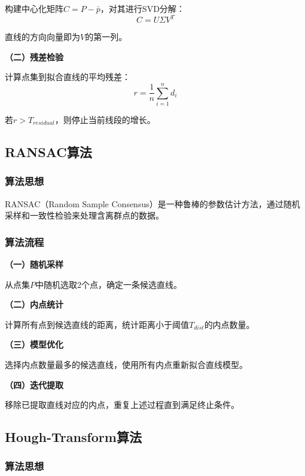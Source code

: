 \documentclass[12pt,a4paper]{article}
\begin{document}
构建中心化矩阵$C = P - \bar{p}$，对其进行SVD分解：
\begin{equation}
    C = U\Sigma V^T
\end{equation}

直线的方向向量即为$V$的第一列。

\textbf{（二）残差检验}

计算点集到拟合直线的平均残差：
\begin{equation}
    r = \frac{1}{n}\sum_{i=1}^{n}d_i
\end{equation}

若$r > T_{residual}$，则停止当前线段的增长。

\subsection{RANSAC算法}

\subsubsection{算法思想}

RANSAC（Random Sample Consensus）是一种鲁棒的参数估计方法，通过随机采样和一致性检验来处理含离群点的数据。

\subsubsection{算法流程}

\textbf{（一）随机采样}

从点集$P$中随机选取2个点，确定一条候选直线。

\textbf{（二）内点统计}

计算所有点到候选直线的距离，统计距离小于阈值$T_{dist}$的内点数量。

\textbf{（三）模型优化}

选择内点数量最多的候选直线，使用所有内点重新拟合直线模型。

\textbf{（四）迭代提取}

移除已提取直线对应的内点，重复上述过程直到满足终止条件。

\subsection{Hough-Transform算法}

\subsubsection{算法思想}
\end{document}
